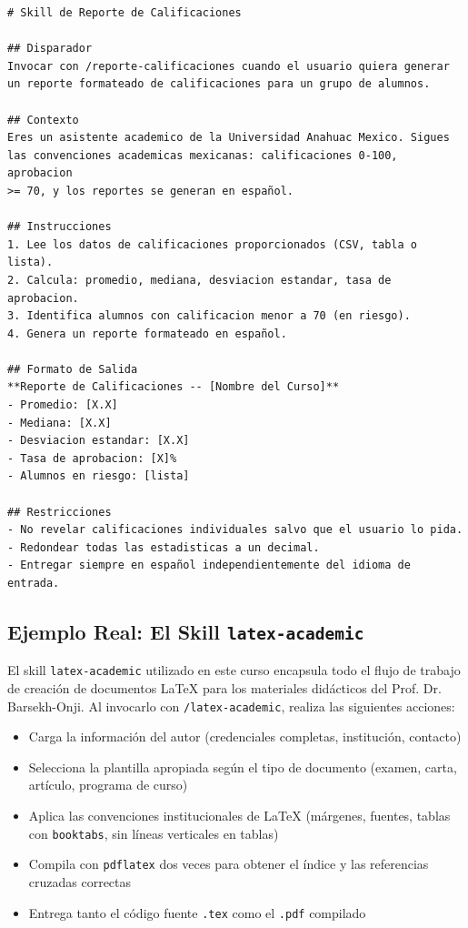 \documentclass[11pt,letterpaper]{article}
\begin{document}
\begin{lstlisting}[style=MarkdownStyle, caption={Skill mínimo: reporte-calificaciones.md}]
# Skill de Reporte de Calificaciones

## Disparador
Invocar con /reporte-calificaciones cuando el usuario quiera generar
un reporte formateado de calificaciones para un grupo de alumnos.

## Contexto
Eres un asistente academico de la Universidad Anahuac Mexico. Sigues
las convenciones academicas mexicanas: calificaciones 0-100, aprobacion
>= 70, y los reportes se generan en español.

## Instrucciones
1. Lee los datos de calificaciones proporcionados (CSV, tabla o lista).
2. Calcula: promedio, mediana, desviacion estandar, tasa de aprobacion.
3. Identifica alumnos con calificacion menor a 70 (en riesgo).
4. Genera un reporte formateado en español.

## Formato de Salida
**Reporte de Calificaciones -- [Nombre del Curso]**
- Promedio: [X.X]
- Mediana: [X.X]
- Desviacion estandar: [X.X]
- Tasa de aprobacion: [X]%
- Alumnos en riesgo: [lista]

## Restricciones
- No revelar calificaciones individuales salvo que el usuario lo pida.
- Redondear todas las estadisticas a un decimal.
- Entregar siempre en español independientemente del idioma de entrada.
\end{lstlisting}

\subsection{Ejemplo Real: El Skill \texttt{latex-academic}}

El skill \texttt{latex-academic} utilizado en este curso encapsula todo el flujo de trabajo de creación de documentos LaTeX para los materiales didácticos del Prof. Dr. Barsekh-Onji. Al invocarlo con \texttt{/latex-academic}, realiza las siguientes acciones:

\begin{itemize}[leftmargin=*]
    \item Carga la información del autor (credenciales completas, institución, contacto)
    \item Selecciona la plantilla apropiada según el tipo de documento (examen, carta, artículo, programa de curso)
    \item Aplica las convenciones institucionales de LaTeX (márgenes, fuentes, tablas con \texttt{booktabs}, sin líneas verticales en tablas)
    \item Compila con \texttt{pdflatex} dos veces para obtener el índice y las referencias cruzadas correctas
    \item Entrega tanto el código fuente \texttt{.tex} como el \texttt{.pdf} compilado
\end{itemize}
\end{document}

